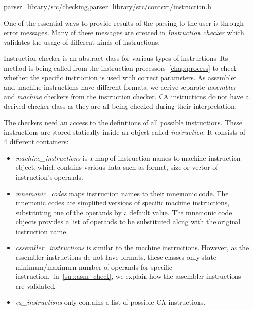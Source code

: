 {parser\_library/src/checking,parser\_library/src/context/instruction.h}

\label{checker}
One of the essential ways to provide results of the parsing to the user is through error messages. Many of these messages are created in \emph{Instruction checker} which validates the usage of different kinds of instructions.

Instruction checker is an abstract class for various types of instructions. Its  method is being called from the instruction processors~\ref{chap:process} to check whether the specific instruction is used with correct parameters. As assembler and machine instructions have different formats, we derive separate \emph{assembler} and \emph{machine} checkers from the instruction checker. CA instructions do not have a derived checker class as they are all being checked during their interpretation.

The checkers need an access to the definitions of all possible instructions. These instructions are stored statically inside an object called \emph{instruction}. It consists of 4 different containers:
\begin{itemize}
	\item \emph{machine\_instructions} is a map of instruction names to machine instruction object, which contains various data such as format, size or vector of instruction's operands.
	\item \emph{mnemonic\_codes} maps instruction names to their mnemonic code. The mnemonic codes are simplified versions of specific machine instructions, substituting one of the operands by a default value. The mnemonic code objects provides a list of operands to be substituted along with the original instruction name.
	\item \emph{assembler\_instructions} is similar to the machine instructions. However, as the assembler instructions do not have formats, these classes only state minimum/maximum number of operands for specific instruction.~In~\cref{sub:asm_check}, we explain how the assembler instructions are validated.
	\item \emph{ca\_instructions} only contains a list of possible CA instructions.
\end{itemize}

